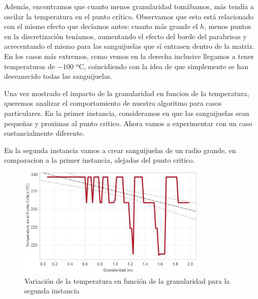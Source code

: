 Además, encontramos que cuanto menos granularidad tomábamos, más tendía a oscilar la temperatura en el punto crítico. Observamos que esto está relacionado con el mismo efecto que decíamos antes: cuanto más grande el $h$, menos puntos en la discretización teníamos, aumentando el efecto del borde del parabrisas y acrecentando el mismo para las sanguijuelas que sí entrasen dentro de la matriz. En los casos más extremos, como vemos en la derecha inclusive llegamos a tener temperaturas de $-100$ ºC, coincidiendo con la idea de que simplemente se han desvanecido todas las sanguijuelas.

Una vez mostrado el impacto de la granularidad en funcion de la temperatura, queremos analizar el comportamiento de nuestro algoritmo para casos particulares. En la primer instancia, consideramos en que las sanguijuelas sean peque\`nas y proximas al punto critico. Ahora vamos a experimentar con un caso sustancialmente diferente. 

En la segunda instancia vamos a crear sanguijuelas de un radio grande, en comparacion a la primer instancia, alejadas del punto critico.

\begin{figure}[h]
    \includegraphics[width=0.8\textwidth]{experimento 1-2}
    \caption{Variación de la temperatura en función de la granularidad para la segunda instancia}
    \label{fig:exp12}
\end{figure}